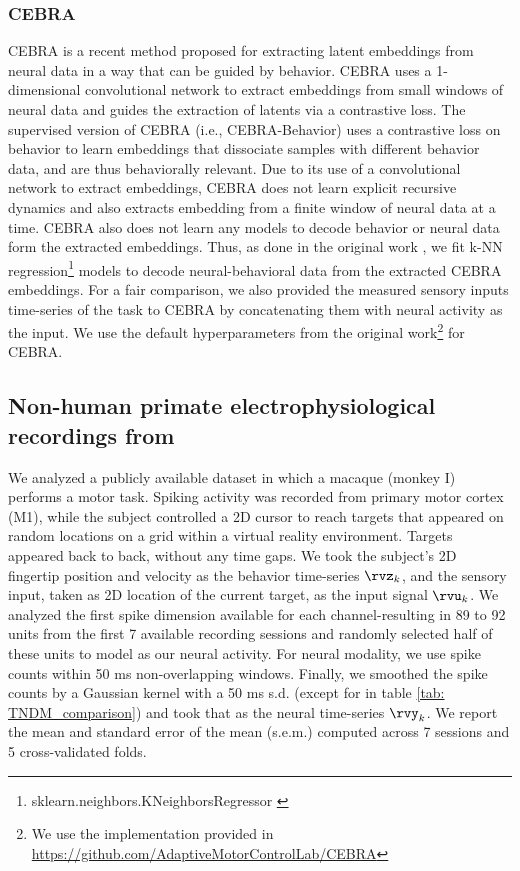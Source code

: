 \documentclass{article} %
\begin{document}
\subsubsection{CEBRA}\label{app:CEBRA_method}

CEBRA \citep{schneider2023learnable} is a recent method proposed for extracting latent embeddings from neural data in a way that can be guided by behavior. CEBRA uses a 1-dimensional convolutional network to extract embeddings from small windows of neural data and guides the extraction of latents via a contrastive loss. The supervised version of CEBRA (i.e., CEBRA-Behavior) uses a contrastive loss on behavior to learn embeddings that dissociate samples with different behavior data, and are thus behaviorally relevant. Due to its use of a convolutional network to extract embeddings, CEBRA does not learn explicit recursive dynamics and also extracts embedding from a finite window of neural data at a time. CEBRA also does not learn any models to decode behavior or neural data form the extracted embeddings. Thus, as done in the original work \citep{schneider2023learnable}, we fit k-NN regression\footnote{sklearn.neighbors.KNeighborsRegressor \citep{scikit-learn}} models to decode neural-behavioral data from the extracted CEBRA embeddings. For a fair comparison, we also provided the measured sensory inputs time-series of the task to CEBRA by concatenating them with neural activity as the input. We use the default hyperparameters from the original work\footnote{We use the implementation provided in \url{https://github.com/AdaptiveMotorControlLab/CEBRA}} for CEBRA.

\subsection{Non-human primate electrophysiological recordings from}\label{app: dataDetails}
We analyzed a publicly available dataset \citep{sabes} in which a macaque (monkey I) performs a motor task. Spiking activity was recorded from primary motor cortex (M1), while the subject controlled a 2D cursor to reach targets that appeared on random locations on a grid within a virtual reality environment. Targets appeared back to back, without any time gaps. We took the subject's 2D fingertip position and velocity as the behavior time-series \(\rvz_{k}\), and the sensory input, taken as 2D location of the current target, as the input signal \(\rvu_{k}\). We analyzed the first spike dimension available for each channel-resulting in 89 to 92 units from the first 7 available recording sessions and randomly selected half of these units to model as our neural activity. For neural modality, we use spike counts within 50 ms non-overlapping windows. Finally, we smoothed the spike counts by a Gaussian kernel with a 50 ms s.d. (except for in table \ref{tab: TNDM_comparison}) and took that as the neural time-series \(\rvy_{k}\). We report the mean and standard error of the mean (s.e.m.) computed across 7 sessions and 5 cross-validated folds.
\end{document}
